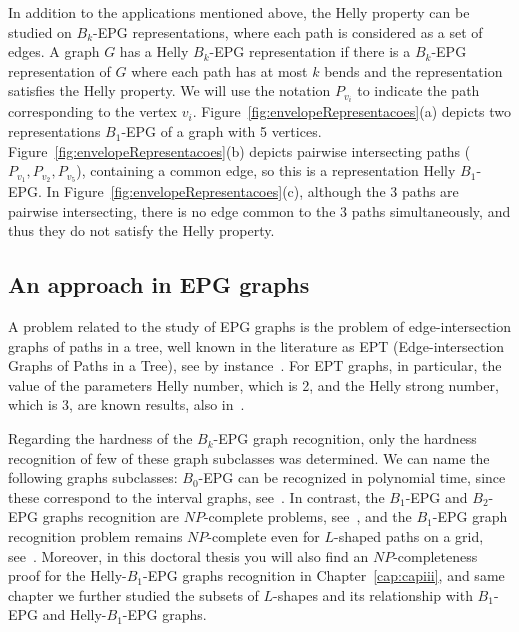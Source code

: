 In addition to the applications mentioned above, the Helly property can be studied on  $ B_k$-EPG representations, where each path is considered as a set of edges. A  graph $ G $ has a Helly $B_k$-EPG representation if there is a $ B_k$-EPG representation of $ G $ where each path has at most $ k $ bends and the representation satisfies the Helly property.
We will use the  notation $ P_{v_i} $ to indicate the path corresponding to the  vertex $ v_i$.
Figure~\ref{fig:envelopeRepresentacoes}(a) depicts two representations $ B_1$-EPG of a graph with 5 vertices. Figure~\ref{fig:envelopeRepresentacoes}(b) depicts pairwise intersecting paths ($ P_{v_1}, P_{v_2}, P_{v_5} $), containing a common edge, so this is a representation Helly $B_1$-EPG. In Figure~\ref{fig:envelopeRepresentacoes}(c), although the 3 paths are pairwise intersecting, there is no edge common to the 3 paths simultaneously, and thus they do not satisfy the Helly property.





\subsection{An approach in EPG graphs}

A problem related to the study of EPG graphs is the problem of edge-intersection graphs of paths in a tree, well known in the literature as EPT (Edge-intersection Graphs of Paths in a Tree), see by instance~\cite{gavril1974intersection, golumbic2004recognition}. For EPT graphs, in particular, the value of the parameters Helly number, which is 2, and the Helly strong number, which is 3, are known results, also in~\cite{golumbic2004recognition}.

Regarding the hardness of the $B_k$-EPG graph recognition, only the hardness recognition of few of these graph subclasses was determined. We can name the following graphs subclasses: $ B_0$-EPG can be recognized in polynomial time, since these correspond to the interval graphs, see~\cite{booth1976}. In contrast, the $ B_1$-EPG and $ B_2$-EPG graphs recognition are $ NP$-complete problems, see~\cite{heldt2014, martin2017}, and the $ B_1$-EPG graph recognition problem remains $ NP$-complete even  for $ L$-shaped paths on a grid, see~\cite{cameron2016edge}. Moreover, in this doctoral thesis you will also find an $ NP$-completeness proof  for the  Helly-$B_1$-EPG graphs recognition in Chapter~\ref{cap:capiii}, and same chapter we further studied the subsets of $L$-shapes and its relationship with $B_1$-EPG and Helly-$B_1$-EPG graphs.

